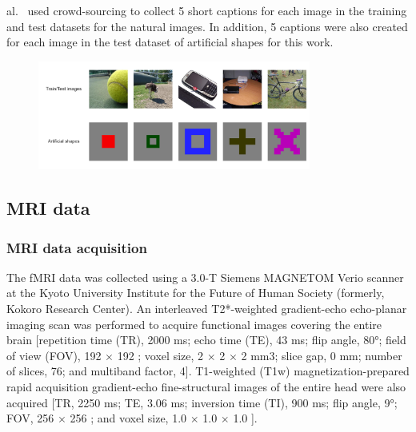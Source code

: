 al.~\cite{shirakawaSpuriousReconstructionBrain2024} used crowd-sourcing to collect 5 short captions for each image in the training and test datasets for the natural images. In addition, 5 captions were also created for each image in the test dataset of artificial shapes for this work.

\begin{figure}[ht]
    \centering
    \includegraphics[width=0.8\textwidth]{plots/datasets_train_art_images.jpeg}
    \caption[Selection of natural images and artificial shapes]{}\label{fig:datasets_train_art}
\end{figure}

\subsection{MRI data}
\subsubsection{MRI data acquisition}
The fMRI data was collected using a 3.0-T Siemens MAGNETOM Verio scanner at the Kyoto University Institute for the Future of Human Society (formerly, Kokoro Research Center). An interleaved T2*-weighted gradient-echo echo-planar imaging scan was performed to acquire functional images covering the entire brain [repetition time (TR), 2000 ms; echo time (TE), 43 ms; flip angle, 80°; field of view (FOV), 192 $\times$ 192 ; voxel size, 2 $\times$ 2 $\times$ 2 mm3; slice gap, 0 mm; number of slices, 76; and multiband factor, 4]. T1-weighted (T1w) magnetization-prepared rapid acquisition gradient-echo fine-structural images of the entire head were also acquired [TR, 2250 ms; TE, 3.06 ms; inversion time (TI), 900 ms; flip angle, 9°; FOV, 256 $\times$ 256 ; and voxel size, 1.0 $\times$ 1.0 $\times$ 1.0 ].


